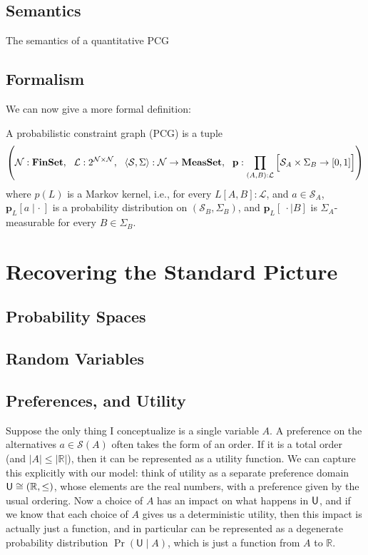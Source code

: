 \documentclass{article}
\begin{document}
	\subsection{Semantics}
	The semantics of a quantitative PCG 
	
	
	
	\subsection{Formalism}
	We can now give a more formal definition:
	\begin{defn}\label{def:pcg}
		A probabilistic constraint graph (PCG) is a tuple 
		\[ \left(\mathcal N : \mathbf{FinSet},~~\mathcal L : 2^{\cal N \times N},~~ \langle\mathcal S, \Sigma\rangle : \mathcal N \to \mathbf{MeasSet}, ~~\mathbf p : \prod_{(A,B): \mathcal L} \left[ \Big. \mathcal S_A \times \Sigma_B \to [0,1]\right] \right) \]
		where $p(L)$ is a Markov kernel, i.e., for every $L[A,B] : \mathcal L$, and $a \in \mathcal S_A$, $\mathbf p_L[a \mid \cdot~]$ is a probability distribution on $(\mathcal S_B, \Sigma_B)$, and $\mathbf p_L[~\cdot \mid B]$ is $\Sigma_A$-measurable for every $B \in \Sigma_B$.
	\end{defn}
		

	\section{Recovering the Standard Picture}
	
	\subsection{Probability Spaces}
	
	\subsection{Random Variables}
	
	\subsection{Preferences, and Utility}

	Suppose the only thing I conceptualize is a single variable $A$. A preference on the alternatives $a \in \mathcal S(A)$ often takes the form of an order. If it is a total order (and $|A| \leq |\mathbb R|$), then it can be represented as a utility function. We can capture this explicitly with our model: think of utility as a separate preference domain $\sf U \cong (\mathbb R, \leq)$, whose elements are the real numbers, with a preference given by the usual ordering. Now a choice of $A$ has an impact on what happens in $\sf U$, and if we know that each choice of $A$ gives us a deterministic utility, then this impact is actually just a function, and in particular can be represented as a degenerate probability distribution $\Pr( \mathsf U \mid A)$, which is just a function from $A$ to $\mathbb R$.
	
\end{document}
